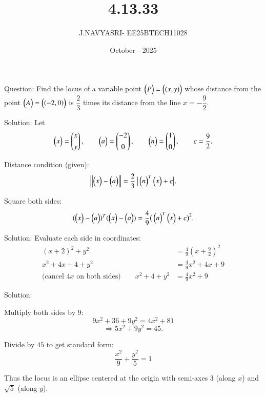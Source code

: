 \documentclass{beamer}
\title %
{4.13.33}
\date{October - 2025}
\author %
{J.NAVYASRI- EE25BTECH11028}
\begin{document}
\frame{\titlepage}
\begin{frame}{Question:}
    Find the locus of a variable point \(\begin{pmatrix}P\end{pmatrix} = \begin{pmatrix}(x, y)\end{pmatrix}\) whose distance from the point \(\begin{pmatrix}A\end{pmatrix} = \begin{pmatrix}(-2, 0)\end{pmatrix}\) is 
\(\dfrac{2}{3}\) times its distance from the line \(x = -\dfrac{9}{2}\).
\end{frame}


\begin{frame}{Solution:}
Let
\[
\begin{pmatrix}x\end{pmatrix}=\begin{pmatrix}x\\[4pt]y\end{pmatrix},\qquad
\begin{pmatrix}a\end{pmatrix}=\begin{pmatrix}-2\\[4pt]0\end{pmatrix},\qquad
\begin{pmatrix}n\end{pmatrix}=\begin{pmatrix}1\\[4pt]0\end{pmatrix},\qquad
c=\frac{9}{2}.
\]

Distance condition (given):
\begin{equation}
\label{eq:dist}
\left\lVert \begin{pmatrix}x\end{pmatrix}-\begin{pmatrix}a\end{pmatrix} \right\rVert
= \frac{2}{3}\,\big|\begin{pmatrix}n\end{pmatrix}^T\begin{pmatrix}x\end{pmatrix}+c\big|.
\end{equation}

Square both sides:
\begin{equation}
\label{eq:squared}
(\begin{pmatrix}x\end{pmatrix}-\begin{pmatrix}a\end{pmatrix})^T(\begin{pmatrix}x\end{pmatrix}-\begin{pmatrix}a\end{pmatrix})
= \frac{4}{9}\big(\begin{pmatrix}n\end{pmatrix}^T\begin{pmatrix}x\end{pmatrix}+c\big)^2.
\end{equation}
\end{frame}

\begin{frame}{Solution:}
Evaluate each side in coordinates:
\begin{align}
(x+2)^2 + y^2
&= \frac{4}{9}\!\left(x+\frac{9}{2}\right)^{\!2} \\
x^2+4x+4 + y^2
&= \frac{4}{9}x^2 + 4x + 9 \\
\text{(cancel }4x\text{ on both sides)}\qquad
x^2 + 4 + y^2
&= \frac{4}{9}x^2 + 9
\end{align}
\end{frame}

\begin{frame}{Solution:}

Multiply both sides by $9$:
\[
9x^2 + 36 + 9y^2 = 4x^2 + 81
\]
\[
\Rightarrow 5x^2 + 9y^2 = 45.
\]

Divide by $45$ to get standard form:
\begin{equation}
\boxed{\;\dfrac{x^2}{9} + \dfrac{y^2}{5} = 1\;}
\end{equation}

Thus the locus is an ellipse centered at the origin with semi-axes $3$ (along $x$) and $\sqrt{5}$ (along $y$).
\end{frame}
\end{document}
